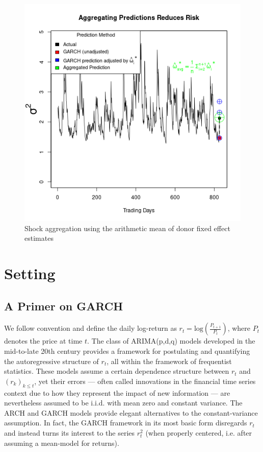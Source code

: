 \documentclass[11pt]{article}
\theoremstyle{definition}
\begin{document}
  \begin{figure}[h]
    \begin{center}
      \includegraphics[scale=.4]{simulation_plots/USE_in_paper_simulation_plot_arithmetic_mean.png}
      \caption{Shock aggregation using the arithmetic mean of donor fixed effect estimates}
      \label{fig:arith_mean_example_introduction}
      \end{center}
    \end{figure}

\section{Setting}
\label{section2}

\subsection{A Primer on GARCH}
We follow convention and define the daily log-return as $r_{t} = \text{log}(\frac{P_{t+1}}{P_{t}})$, where $P_{t}$ denotes the price at time $t$.  The class of ARIMA(p,d,q) models developed in the mid-to-late 20th century \citep{box2013box} provides a framework for postulating and quantifying the autoregressive structure of $r_{t}$, all within the framework of frequentist statistics.  These models assume a certain dependence structure between $r_{t}$ and $(r_{k})_{k\leq t}$, yet their errors --- often called innovations in the financial time series context due to how they represent the impact of new information --- are nevertheless assumed to be i.i.d. with mean zero and constant variance.  The ARCH \citep{engle1982autoregressive} and GARCH \citep{bollerslev1986generalized} models provide elegant alternatives to the constant-variance assumption.  In fact, the GARCH framework in its most basic form disregards $r_{t}$ and instead turns its interest to the series $r_{t}^{2}$ (when properly centered, i.e. after assuming a mean-model for returns).  
\end{document}
